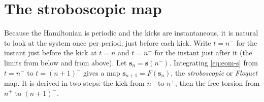 \documentclass[11pt,a4paper]{article}
\newcommand{\vs}{\bm{s}}
\begin{document}
\section{The stroboscopic map}\label{sec:map}

Because the Hamiltonian is periodic and the kicks are instantaneous, it is natural to look at the system once per
period, just before each kick. Write $t = n^-$ for the instant just before the kick at $t = n$ and $t = n^+$ for the
instant just after it (the limits from below and from above). Let $\vs_n = \vs(n^-)$. Integrating
\eqref{eq:eom-s} from $t=n^-$ to $t=(n+1)^-$ gives a map $\vs_{n+1} = F(\vs_n)$, the \emph{stroboscopic} or
\emph{Floquet} map. It is derived in two steps: the kick from $n^-$ to $n^+$, then the free torsion from $n^+$ to
$(n+1)^-$.
\end{document}
